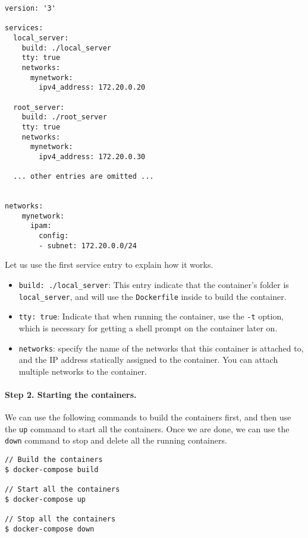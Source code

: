 \begin{lstlisting}[caption={\texttt{docker-compose.yml}}]
version: '3'

services:
  local_server:                  
    build: ./local_server
    tty: true
    networks:
      mynetwork:
        ipv4_address: 172.20.0.20

  root_server:
    build: ./root_server
    tty: true
    networks:
      mynetwork:
        ipv4_address: 172.20.0.30

  ... other entries are omitted ...
   

networks:
    mynetwork:
      ipam:
        config:
        - subnet: 172.20.0.0/24
\end{lstlisting}

Let us use the first service entry to explain how it works. 

\begin{itemize}
\item \texttt{build: ./local\_server}: This entry indicate that the container's folder 
is \texttt{local\_server}, and will use the \texttt{Dockerfile} inside to build the container.

\item \texttt{tty: true}: Indicate that when running the container, use the 
\texttt{-t} option, which is necessary for getting a shell prompt 
on the container later on. 

\item \texttt{networks}: specify the name of the networks that this container is attached to,
and the IP address statically assigned to the container. You can attach multiple networks
to the container. 
\end{itemize}
 

\paragraph{Step 2. Starting the containers.}
We can use the following commands to build the containers first, and then 
use the \texttt{up} command to start all the containers. Once we are done,
we can use the \texttt{down} command to stop and delete all the running containers.  


\begin{lstlisting}
// Build the containers 
$ docker-compose build

// Start all the containers 
$ docker-compose up

// Stop all the containers
$ docker-compose down
\end{lstlisting}


